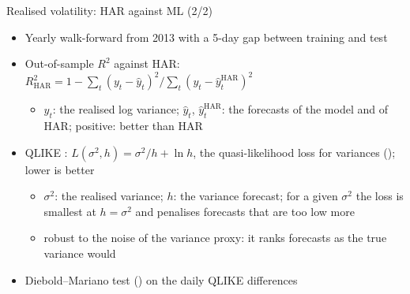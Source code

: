\begin{frame}{Realised volatility: HAR against ML (2/2)}
\itemsize{\footnotesize}
\begin{itemize}
    \item Yearly walk-forward from 2013 with a 5-day gap between training and test
    \item Out-of-sample $R^2$ against HAR: $R^2_{\text{HAR}} = 1 - \sum_t (y_t - \hat y_t)^2 / \sum_t (y_t - \hat y_t^{\text{HAR}})^2$
    \begin{itemize}
        \item $y_t$: the realised log variance; $\hat y_t$, $\hat y_t^{\text{HAR}}$: the forecasts of the model and of HAR; positive: better than HAR
    \end{itemize}
    \item QLIKE : $L(\sigma^2, h) = \sigma^2/h + \ln h$, the quasi-likelihood loss for variances (); lower is better
    \begin{itemize}
        \item $\sigma^2$: the realised variance; $h$: the variance forecast; for a given $\sigma^2$ the loss is smallest at $h = \sigma^2$ and penalises forecasts that are too low more
        \item robust to the noise of the variance proxy: it ranks forecasts as the true variance would
    \end{itemize}
    \item Diebold--Mariano test () on the daily QLIKE differences
\end{itemize}
\end{frame}

